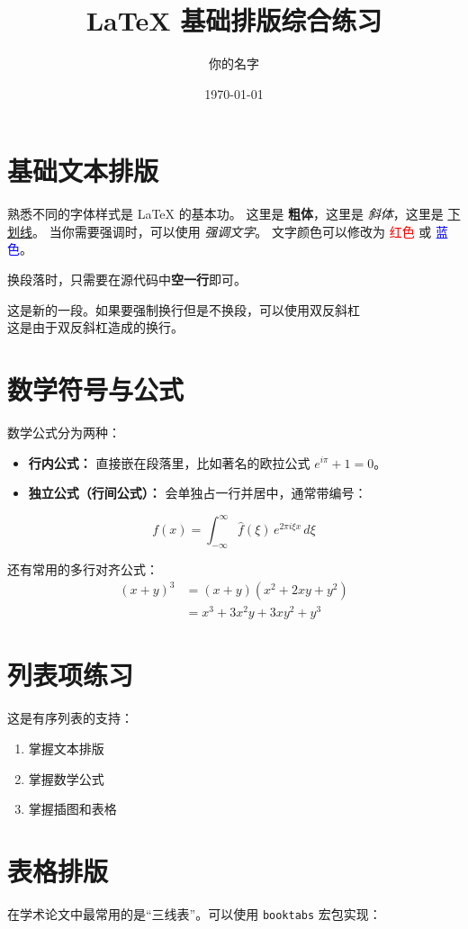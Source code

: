 \documentclass[12pt,a4paper]{article}
\title{\LaTeX{} 基础排版综合练习}
\author{你的名字}
\date{\today}
\begin{document}
\maketitle

\section{基础文本排版}
熟悉不同的字体样式是 \LaTeX{} 的基本功。
这里是 \textbf{粗体}，这里是 \textit{斜体}，这里是 \underline{下划线}。
当你需要强调时，可以使用 \emph{强调文字}。
文字颜色可以修改为 \textcolor{red}{红色} 或 \textcolor{blue}{蓝色}。

换段落时，只需要在源代码中\textbf{空一行}即可。

这是新的一段。如果要强制换行但是不换段，可以使用双反斜杠 \\
这是由于双反斜杠造成的换行。

\section{数学符号与公式}
数学公式分为两种：
\begin{itemize}
    \item \textbf{行内公式：} 直接嵌在段落里，比如著名的欧拉公式 $e^{i\pi} + 1 = 0$。
    \item \textbf{独立公式（行间公式）：} 会单独占一行并居中，通常带编号：
\end{itemize}

\begin{equation}
    f(x) = \int_{-\infty}^{\infty} \hat{f}(\xi)\,e^{2 \pi i \xi x} \,d\xi
\end{equation}

还有常用的多行对齐公式：
\begin{align}
    (x+y)^3 &= (x+y)(x^2 + 2xy + y^2) \nonumber \\ 
            &= x^3 + 3x^2y + 3xy^2 + y^3
\end{align}

\section{列表项练习}
这是有序列表的支持：
\begin{enumerate}
    \item 掌握文本排版
    \item 掌握数学公式
    \item 掌握插图和表格
\end{enumerate}

\section{表格排版}
在学术论文中最常用的是“三线表”。可以使用 \texttt{booktabs} 宏包实现：
\end{document}
